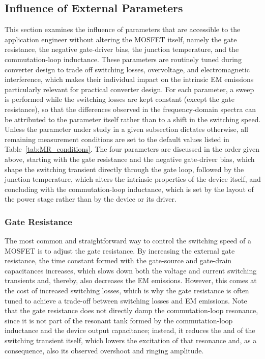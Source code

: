 \subsection{Influence of External Parameters}
\label{sec:MR_External}

This section examines the influence of parameters that are accessible to the application engineer without altering the MOSFET itself, namely the gate resistance, the negative gate-driver bias, the junction temperature, and the commutation-loop inductance.
These parameters are routinely tuned during converter design to trade off switching losses, overvoltage, and electromagnetic interference, which makes their individual impact on the intrinsic EM emissions particularly relevant for practical converter design.
For each parameter, a sweep is performed while the switching losses are kept constant (except the gate resistance), so that the differences observed in the frequency-domain spectra can be attributed to the parameter itself rather than to a shift in the switching speed.
Unless the parameter under study in a given subsection dictates otherwise, all remaining measurement conditions are set to the default values listed in Table~\ref{tab:MR_conditions}.
The four parameters are discussed in the order given above, starting with the gate resistance and the negative gate-driver bias, which shape the switching transient directly through the gate loop, followed by the junction temperature, which alters the intrinsic properties of the device itself, and concluding with the commutation-loop inductance, which is set by the layout of the power stage rather than by the device or its driver.

\subsubsection*{Gate Resistance}

The most common and straightforward way to control the switching speed of a MOSFET is to adjust the gate resistance.
By increasing the external gate resistance, the time constant formed with the gate-source and gate-drain capacitances increases, which slows down both the voltage and current switching transients and, thereby, also decreases the EM emissions.
However, this comes at the cost of increased switching losses, which is why the gate resistance is often tuned to achieve a trade-off between switching losses and EM emissions.
Note that the gate resistance does not directly damp the commutation-loop resonance, since it is not part of the resonant tank formed by the commutation-loop inductance and the device output capacitance; instead, it reduces the  and  of the switching transient itself, which lowers the excitation of that resonance and, as a consequence, also its observed overshoot and ringing amplitude.

